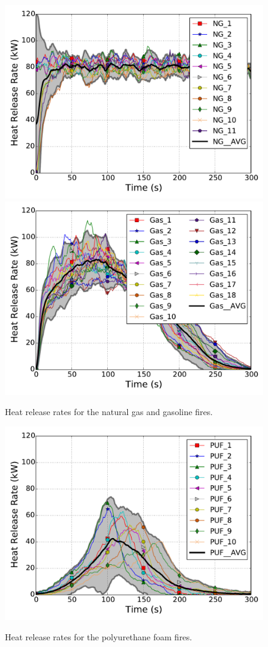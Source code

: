 \documentclass[twoside]{uocthesis}
\begin{document}
{\begin{figure}[!ht]
  \centering
  \includegraphics[width=4.5in]{../Figures/ST_NG_HRR}\\
  \includegraphics[width=4.5in]{../Figures/ST_Gas_HRR}\\
  \caption[Heat release rates for the natural gas and gasoline foam fires]{Heat release rates for the natural gas and gasoline fires.}
  \label{HRR}
\end{figure}

\begin{figure}[!ht]
  \centering
  \includegraphics[width=4.5in]{../Figures/ST_PUF_HRR}\\
  \caption[Heat release rates for the polyurethane foam fires]{Heat release rates for the polyurethane foam fires.}
  \label{HRR2}
\end{figure}


}
\end{document}
